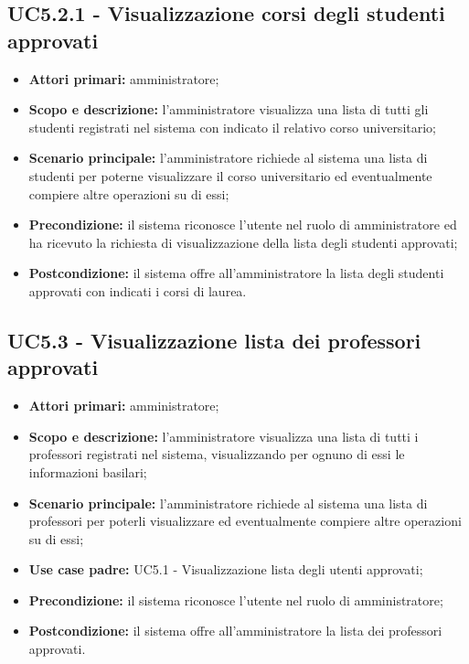 \documentclass[AnalisiDeiRequisiti.tex]{subfiles}
\begin{document}
\subsection{UC5.2.1 - Visualizzazione corsi degli studenti approvati}
\begin{itemize}
	\item \textbf{Attori primari:} amministratore;
	\item \textbf{Scopo e descrizione:} l'amministratore visualizza una lista di tutti gli studenti registrati nel sistema con indicato il relativo corso universitario;
	\item \textbf{Scenario principale:} l'amministratore richiede al sistema una lista di studenti per poterne visualizzare il corso universitario ed eventualmente compiere altre operazioni su di essi;
	\item \textbf{Precondizione:} il sistema riconosce l'utente nel ruolo di amministratore ed ha ricevuto la richiesta di visualizzazione della lista degli studenti approvati;
	\item \textbf{Postcondizione:} il sistema offre all'amministratore la lista degli studenti approvati con indicati i corsi di laurea.
\end{itemize}
\subsection{UC5.3 - Visualizzazione lista dei professori approvati}
\begin{itemize}
	\item \textbf{Attori primari:} amministratore;
	\item \textbf{Scopo e descrizione:} l'amministratore visualizza una lista di tutti i professori registrati nel sistema, visualizzando per ognuno di essi le informazioni basilari;
	\item \textbf{Scenario principale:} l'amministratore richiede al sistema una lista di professori per poterli visualizzare ed eventualmente compiere altre operazioni su di essi;
	\item \textbf{Use case padre:} UC5.1 - Visualizzazione lista degli utenti approvati;
	\item \textbf{Precondizione:} il sistema riconosce l'utente nel ruolo di amministratore; 
	\item \textbf{Postcondizione:} il sistema offre all'amministratore la lista dei professori approvati.
\end{itemize}
\end{document}
